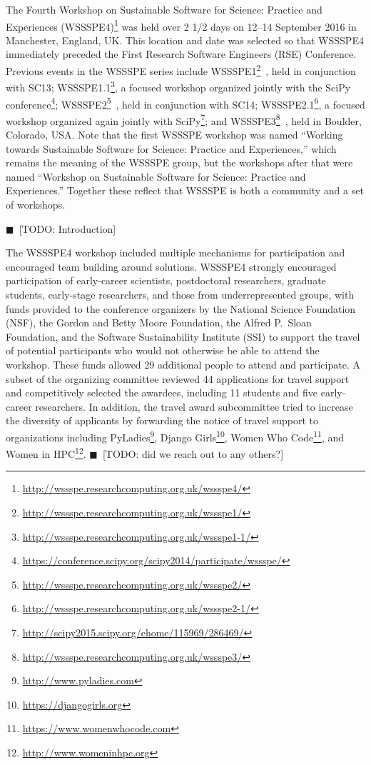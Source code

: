 \documentclass[11pt, oneside]{amsart}
\newcommand{\todo}[1]{{\color{blue}$\blacksquare$~\textsf{[TODO: #1]}}}
\begin{document}
The Fourth Workshop on Sustainable Software for Science: Practice and Experiences
(WSSSPE4)\footnote{\url{http://wssspe.researchcomputing.org.uk/wssspe4/}} was
held over 2 1/2 days on 12--14 September 2016 in Manchester, England, UK.
This location and date was selected so that WSSSPE4 immediately preceded the
First Research Software Engineers (RSE) Conference.
Previous events in the WSSSPE series include
WSSSPE1\footnote{\url{http://wssspe.researchcomputing.org.uk/wssspe1/}}~\cite{WSSSPE1-pre-report,WSSSPE1},
held in conjunction with SC13;
WSSSPE1.1\footnote{\url{http://wssspe.researchcomputing.org.uk/wssspe1-1/}}, a
focused workshop organized jointly with the SciPy
conference\footnote{\url{https://conference.scipy.org/scipy2014/participate/wssspe/}};
WSSSPE2\footnote{\url{http://wssspe.researchcomputing.org.uk/wssspe2/}}~\cite{WSSSPE2-pre-report,WSSSPE2},
held in conjunction with SC14;
WSSSPE2.1\footnote{\url{http://wssspe.researchcomputing.org.uk/wssspe2-1/}}, a
focused workshop organized again jointly with
SciPy\footnote{\url{http://scipy2015.scipy.org/ehome/115969/286469/}};
and WSSSPE3\footnote{\url{http://wssspe.researchcomputing.org.uk/wssspe3/}}~\cite{WSSSPE3},
held in Boulder, Colorado, USA.
Note that the first WSSSPE workshop was named
``Working towards
Sustainable Software for Science: Practice and Experiences,'' which remains the meaning
of the WSSSPE group, but the workshops after that were named
``Workshop on Sustainable
Software for Science: Practice and Experiences.'' Together these reflect
that WSSSPE is both a community and a set of workshops.

\todo{Introduction}

The WSSSPE4 workshop included multiple mechanisms for participation and
encouraged team building around solutions. WSSSPE4 strongly encouraged participation
of early-career scientists, postdoctoral researchers, graduate students,
early-stage researchers, and those from underrepresented groups,
with funds provided to the conference organizers by the National Science
Foundation (NSF), the Gordon and Betty Moore Foundation, the Alfred P.~Sloan Foundation, and the Software
Sustainability Institute (SSI) to support the travel of potential participants
who would not otherwise be able to attend the workshop. These
funds allowed 29 additional people to attend and participate. A subset of the
organizing committee reviewed 44 applications for travel support and
competitively selected the awardees, including 11 students and five early-career
researchers. In addition, the travel award subcommittee tried to increase the
diversity of applicants by forwarding the notice of travel support to
organizations including PyLadies\footnote{\url{http://www.pyladies.com}},
Django Girls\footnote{\url{https://djangogirls.org}},
Women Who Code\footnote{\url{https://www.womenwhocode.com}}, and
Women in HPC\footnote{\url{http://www.womeninhpc.org}}.
\todo{did we reach out to any others?}
\end{document}
